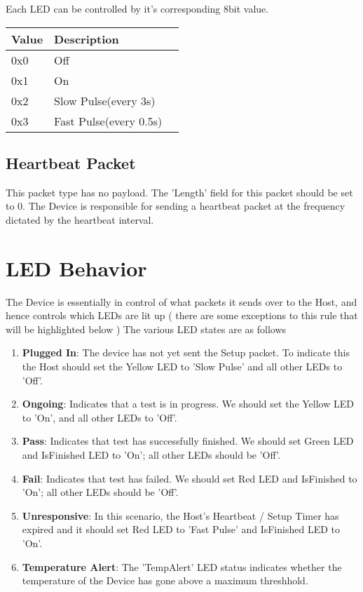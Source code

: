 Each LED can be controlled by it's corresponding 8bit value.

\begin{center}
\renewcommand{\arraystretch}{1.5}
\begin{longtable}{llp{}}
   Value & Description \\ \hline
   0x0  & Off \\
   0x1  & On \\
   0x2  & Slow Pulse(every 3s) \\
   0x3 & Fast Pulse(every 0.5s)
\end{longtable}
\end{center}

\subsection{Heartbeat Packet}

This packet type has no payload. The 'Length' field for this packet should be set to 0. The Device is responsible for sending a heartbeat packet at the frequency dictated by the heartbeat interval.

\section{LED Behavior}

The Device is essentially in control of what packets it sends over to the Host, and hence controls which LEDs are lit up ( there are some exceptions to this rule that will be highlighted below ) The various LED states are as follows

\begin{enumerate}
\item {\bfseries Plugged In}: The device has not yet sent the Setup packet. To indicate this the Host should set the Yellow LED to 'Slow Pulse' and all other LEDs to 'Off'.
\item {\bfseries Ongoing}:  Indicates that a test is in progress. We should set the Yellow LED to 'On', and all other LEDs to 'Off'.
\item {\bfseries  Pass}: Indicates that test has successfully finished. We should set Green LED and IsFinished LED to 'On'; all other LEDs should be 'Off'.
\item {\bfseries Fail}: Indicates that test has failed. We should set Red LED and IsFinished to 'On'; all other LEDs should be 'Off'.
\item {\bfseries Unresponsive}: In this scenario, the Host's Heartbeat / Setup Timer has expired and it should set Red LED to 'Fast Pulse' and IsFinished LED to 'On'.
\item {\bfseries Temperature Alert}: The 'TempAlert' LED status indicates whether the temperature of the Device has gone above a maximum threshhold.
\end{enumerate}

